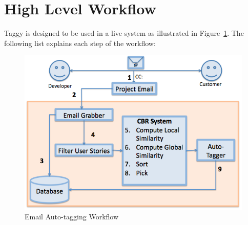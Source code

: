 \section{High Level Workflow}
Taggy is designed to be used in a live system as illustrated in Figure~\ref{fig:workflow}. The following list explains each step of the workflow: 
\begin{figure}[!h]
	\centering
	\includegraphics[width=\textwidth]{workflow.png}
	\caption{Email Auto-tagging Workflow}
	\label{fig:workflow}
\end{figure}

